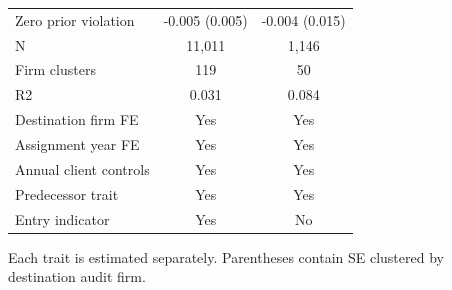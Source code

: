 \begin{table}[!htbp]
{\begin{tabular}{lcc}
Zero prior violation & -0.005 (0.005) & -0.004 (0.015) \\
N & 11,011 & 1,146 \\
Firm clusters & 119 & 50 \\
R2 & 0.031 & 0.084 \\
Destination firm FE & Yes & Yes \\
Assignment year FE & Yes & Yes \\
Annual client controls & Yes & Yes \\
Predecessor trait & Yes & Yes \\
Entry indicator & Yes & No \\
\bottomrule
\end{tabular}}
\begin{minipage}{\textwidth}\footnotesize Each trait is estimated separately. Parentheses contain SE clustered by destination audit firm.\end{minipage}
\end{table}

